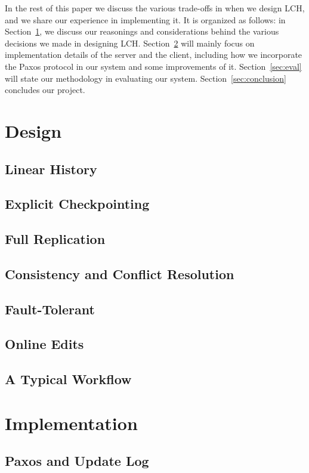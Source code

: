 \documentclass[11pt]{article}
\begin{document}
In the rest of this paper we discuss the various trade-offs in when we design LCH, and we share our experience in implementing it.
It is organized as follows: in Section~\ref{sec:design}, we discuss our reasonings and considerations behind the various decisions we made in designing LCH.
Section~\ref{sec:impl} will mainly focus on implementation details of the server and the client, including how we incorporate the Paxos protocol in our system and some improvements of it.
Section~\ref{sec:eval} will state our methodology in evaluating our system.
Section~\ref{sec:conclusion} concludes our project.


\section{Design}
\label{sec:design}
\subsection{Linear History}
\subsection{Explicit Checkpointing}
\subsection{Full Replication}
\subsection{Consistency and Conflict Resolution}
\subsection{Fault-Tolerant}
\subsection{Online Edits}
\subsection{A Typical Workflow}

\section{Implementation}
\label{sec:impl}
\subsection{Paxos and Update Log}
\end{document}
